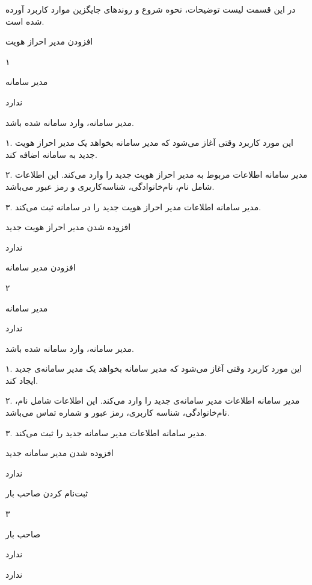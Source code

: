 
 در این قسمت لیست توضیحات، نحوه شروع و  روندهای جایگزین موارد کاربرد آورده شده است.

افزودن مدیر احراز هویت

۱

مدیر سامانه

ندارد

مدیر سامانه، وارد سامانه شده باشد.


۱. این مورد کاربرد وقتی آغاز می‌شود که مدیر سامانه بخواهد یک مدیر احراز هویت جدید به سامانه اضافه کند.

۲. مدیر سامانه اطلاعات مربوط به مدیر احراز هویت جدید را وارد می‌کند. این اطلاعات شامل نام، نام‌خانوادگی، شناسه‌کاربری و  رمز عبور می‌باشد.

۳. مدیر سامانه اطلاعات مدیر احراز هویت جدید را در سامانه ثبت می‌کند.

افزوده شدن مدیر احراز هویت جدید

ندارد

\newpage

افزودن مدیر سامانه

۲

مدیر سامانه

ندارد

مدیر سامانه، وارد سامانه شده باشد.


۱. این مورد کاربرد وقتی آغاز می‌شود که مدیر سامانه بخواهد یک مدیر سامانه‌ی جدید ایجاد کند.

۲. مدیر سامانه اطلاعات مدیر سامانه‌ی جدید را وارد می‌کند. این اطلاعات شامل نام، نام‌خانوادگی، شناسه کاربری، رمز عبور و شماره تماس می‌باشد.

۳. مدیر سامانه اطلاعات مدیر سامانه جدید را ثبت می‌کند.

افزوده شدن مدیر سامانه جدید

ندارد


\newpage

ثبت‌نام کردن صاحب بار

۳

صاحب بار

ندارد

ندارد


